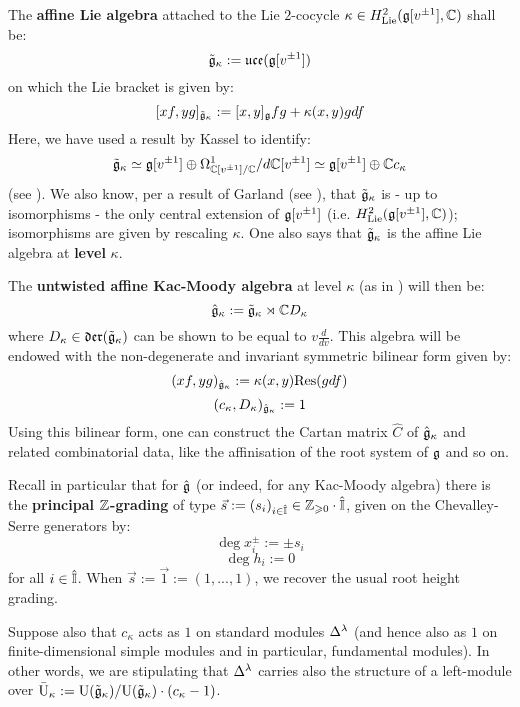             The \textbf{affine Lie algebra} attached to the Lie $2$-cocycle $\kappa \in H^2_{\mathrm{Lie}}(\mathfrak{g}[v^{\pm 1}], \mathbb{C})$ shall be:
                $$\tilde{\mathfrak{g}}_{\kappa} := \mathfrak{uce}(\mathfrak{g}[v^{\pm 1}])$$
            on which the Lie bracket is given by:
                $$[xf, yg]_{\tilde{\mathfrak{g}}_{\kappa}} := [x, y]_{\mathfrak{g}} fg + \kappa(x, y) g df$$
            Here, we have used a result by Kassel to identify:
                $$\tilde{\mathfrak{g}}_{\kappa} \simeq \mathfrak{g}[v^{\pm 1}] \oplus \Omega^1_{\mathbb{C}[v^{\pm 1}]/\mathbb{C}}/d\mathbb{C}[v^{\pm 1}] \simeq \mathfrak{g}[v^{\pm 1}] \oplus \mathbb{C} c_{\kappa}$$
            (see \cite{kassel_universal_central_extensions_of_lie_algebras}). We also know, per a result of Garland (see \cite{garland_arithmetics_of_looq_groups}), that $\tilde{\mathfrak{g}}_{\kappa}$ is - up to isomorphisms - the only central extension of $\mathfrak{g}[v^{\pm 1}]$ (i.e. $H^2_{\mathrm{Lie}}(\mathfrak{g}[v^{\pm 1}], \mathbb{C})$); isomorphisms are given by rescaling $\kappa$. One also says that $\tilde{\mathfrak{g}}_{\kappa}$ is the affine Lie algebra at \textbf{level} $\kappa$.
    
            The \textbf{untwisted affine Kac-Moody algebra} at level $\kappa$ (as in \cite[Chapter 7]{kac_infinite_dimensional_lie_algebras}) will then be:
                $$\hat{\mathfrak{g}}_{\kappa} := \tilde{\mathfrak{g}}_{\kappa} \rtimes \mathbb{C} D_{\kappa}$$
            where $D_{\kappa} \in \mathfrak{der}(\tilde{\mathfrak{g}}_{\kappa})$ can be shown to be equal to $v\frac{d}{dv}$. This algebra will be endowed with the non-degenerate and invariant symmetric bilinear form given by:
                $$(xf, yg)_{\hat{\mathfrak{g}}_{\kappa}} := \kappa(x, y) \mathrm{Res}(g df)$$
                $$(c_{\kappa}, D_{\kappa})_{\hat{\mathfrak{g}}_{\kappa}} := 1$$
            Using this bilinear form, one can construct the Cartan matrix $\hat{C}$ of $\hat{\mathfrak{g}}_{\kappa}$ and related combinatorial data, like the affinisation of the root system of $\mathfrak{g}$ and so on.
                
            Recall in particular that for $\hat{\mathfrak{g}}$ (or indeed, for any Kac-Moody algebra) there is the \textbf{principal $\mathbb{Z}$-grading} of type $\vec{s} := (s_i)_{i \in \hat{\mathbb{I}}} \in \mathbb{Z}_{\geqslant 0} \cdot \hat{\mathbb{I}}$, given on the Chevalley-Serre generators by:
                $$\deg x_i^{\pm} := \pm s_i$$
                $$\deg h_i := 0$$
            for all $i \in \hat{\mathbb{I}}$. When $\vec{s} := \vec{1} := (1, ..., 1)$, we recover the usual root height grading. 
    
            Suppose also that $c_{\kappa}$ acts as $1$ on standard modules $\Delta^{\lambda}$ (and hence also as $1$ on finite-dimensional simple modules and in particular, fundamental modules). In other words, we are stipulating that $\Delta^{\lambda}$ carries also the structure of a left-module over $\bar{\mathrm{U}}_{\kappa} := \mathrm{U}(\tilde{\mathfrak{g}}_{\kappa})/\mathrm{U}(\tilde{\mathfrak{g}}_{\kappa}) \cdot (c_{\kappa} - 1)$.

